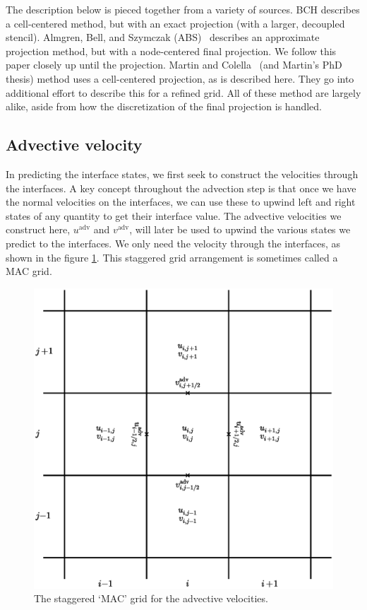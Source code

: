 The description below is pieced together from a variety of sources.
BCH describes a cell-centered method, but with an exact projection
(with a larger, decoupled stencil).  Almgren, Bell, and Szymczak
(ABS)~\cite{ABS} describes an approximate projection method, but with
a node-centered final projection.  We follow this paper closely up
until the projection.  Martin and Colella~\cite{MartinColella} (and
Martin's PhD thesis) method uses a cell-centered projection, as is
described here.  They go into additional effort to describe this for a
refined grid.  All of these method are largely alike, aside from how
the discretization of the final projection is handled.

\subsection{Advective velocity}

In predicting the interface states, we first seek to construct the
velocities through the interfaces.  A key concept throughout the
advection step is that once we have the normal velocities on the
interfaces, we can use these to upwind left and right states of any
quantity to get their interface value.  The advective velocities we
construct here, ${u}^\mathrm{adv}$ and ${v}^\mathrm{adv}$,
will later be used to upwind the various states we predict to the
interfaces.  We only need the velocity through the interfaces, as
shown in the figure \ref{fig:MAC}. This staggered grid arrangement is
sometimes called a MAC grid.

\begin{figure}[h]
\centering
\includegraphics[width=0.8\linewidth]{MAC}
\caption[MAC grid for velocity]
  {\label{fig:MAC} The staggered `MAC' grid for the advective
  velocities.}
\end{figure}


